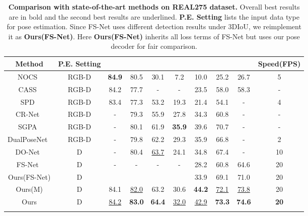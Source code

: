 \documentclass[10pt,twocolumn,letterpaper]{article}
\begin{document}
 \begin{table*}[ht]
\centering
\begin{tabular}{c|c|ccc|cccc|c}
\shline
Method & P.E. Setting &  &  &  &  & & &  & Speed(FPS)\\
\hline
NOCS~\cite{NOCS} & RGB-D & \textbf{84.9} & 80.5 & 30.1 & 7.2 & 10.0 & 25.2 & 26.7 & 5 \\
CASS~\cite{cass} & RGB-D & 84.2 & 77.7 & - & - & 23.5 & 58.0 & 58.3 & - \\
SPD~\cite{shape_deform} & RGB-D & 83.4 & 77.3 & 53.2 & 19.3 & 21.4 & 54.1 & - & 4 \\
CR-Net~\cite{cr-net} & RGB-D & - & 79.3 & 55.9 & 27.8 & 34.3 & 60.8 & - & - \\
SGPA~\cite{sgpa} & RGB-D & - & 80.1 & 61.9 & \textbf{35.9} & 39.6 & 70.7 & - & - \\
DualPoseNet~\cite{dualposenet} & RGB-D & - & 79.8 & 62.2  & 29.3 & 35.9 & 66.8 & - & 2 \\
\hline
DO-Net~\cite{donet} & D & - & 80.4 & \underline{63.7} & 24.1 & 34.8 & 67.4 & - & 10 \\
FS-Net~\cite{fs-net} & D & -& - & - & - & 28.2 & 60.8 & 64.6 & 20
\\
\hline
Ours(FS-Net) & D & &  &  &  & 33.9 & 69.1 & 71.0 & 20 \\
Ours(M) & D & 84.1 &  \underline{82.0} &  63.2 & 30.6 & \textbf{44.2} & \underline{72.1} & \underline{73.8} & 20 \\
Ours & D & \underline{84.2} &  \textbf{83.0} &  \textbf{64.4} & \underline{32.0} & \underline{42.9} & \textbf{73.3} & \textbf{74.6} & \textbf{20} \\
\shline
\end{tabular}
\vspace{-0.3cm}
\caption{\textbf{Comparison with state-of-the-art methods on REAL275 dataset.} Overall best results are in bold and the second best results are underlined.  
\textbf{P.E. Setting} lists the input data type for pose estimation.
Since FS-Net uses different detection results under 3DIoU, we reimplement it as \textbf{Ours(FS-Net)}.
Here \textbf{Ours(FS-Net)} inherits all loss terms of FS-Net but uses our pose decoder for fair comparison.
}
\label{tab_real275}
\end{table*}
\end{document}
